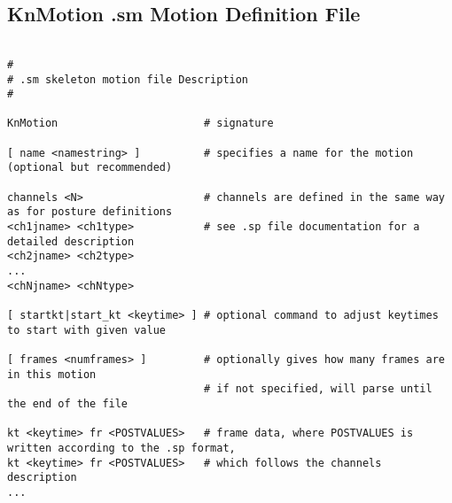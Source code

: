 \subsection{KnMotion .sm Motion Definition File}

\begin{lstlisting}[title={}]

#
# .sm skeleton motion file Description
#

KnMotion                       # signature

[ name <namestring> ]          # specifies a name for the motion (optional but recommended)

channels <N>                   # channels are defined in the same way as for posture definitions
<ch1jname> <ch1type>           # see .sp file documentation for a detailed description
<ch2jname> <ch2type>
...
<chNjname> <chNtype>

[ startkt|start_kt <keytime> ] # optional command to adjust keytimes to start with given value

[ frames <numframes> ]         # optionally gives how many frames are in this motion
                               # if not specified, will parse until the end of the file

kt <keytime> fr <POSTVALUES>   # frame data, where POSTVALUES is written according to the .sp format,
kt <keytime> fr <POSTVALUES>   # which follows the channels description
...

\end{lstlisting}
